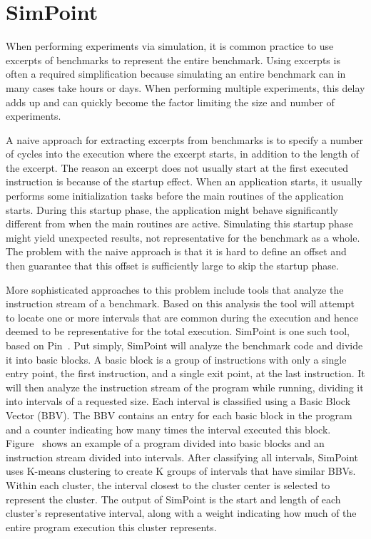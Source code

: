\section{SimPoint}
\label{sec:background:simpoint}

When performing experiments via simulation, it is common practice to use excerpts of benchmarks to represent the entire benchmark.
Using excerpts is often a required simplification because simulating an entire benchmark can in many cases take hours or days.
When performing multiple experiments, this delay adds up and can quickly become the factor limiting the size and number of experiments.

A naive approach for extracting excerpts from benchmarks is to specify a number of cycles into the execution where the excerpt starts, in addition to the length of the excerpt.
The reason an excerpt does not usually start at the first executed instruction is because of the startup effect.
When an application starts, it usually performs some initialization tasks before the main routines of the application starts.
During this startup phase, the application might behave significantly different from when the main routines are active.
Simulating this startup phase might yield unexpected results, not representative for the benchmark as a whole.
The problem with the naive approach is that it is hard to define an offset and then guarantee that this offset is sufficiently large to skip the startup phase.

More sophisticated approaches to this problem include tools that analyze the instruction stream of a benchmark.
Based on this analysis the tool will attempt to locate one or more intervals that are common during the execution and hence deemed to be representative for the total execution.
SimPoint\cite{Hamerly2005} is one such tool, based on Pin~\cite{Luk2005}.
Put simply, SimPoint will analyze the benchmark code and divide it into basic blocks.
A basic block is a group of instructions with only a single entry point, the first instruction, and a single exit point, at the last instruction.
It will then analyze the instruction stream of the program while running, dividing it into intervals of a requested size. 
Each interval is classified using a Basic Block Vector (BBV).
The BBV contains an entry for each basic block in the program and a counter indicating how many times the interval executed this block.
Figure~ shows an example of a program divided into basic blocks and an instruction stream divided into intervals.
After classifying all intervals, SimPoint uses K-means clustering to create K groups of intervals that have  similar BBVs.
Within each cluster, the interval closest to the cluster center is selected to represent the cluster. 
The output of SimPoint is the start and length of each cluster's representative interval, along with a weight indicating how much of the entire program execution this cluster represents.

